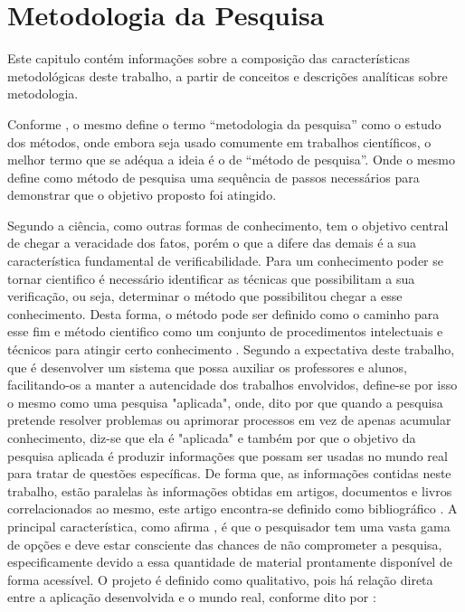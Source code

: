 \chapter{Metodologia da Pesquisa}\label{ch:metodologia-da-pesquisa}

Este capitulo contém informações sobre a composição das
características metodológicas deste trabalho, a partir de conceitos e
descrições analíticas sobre metodologia.

Conforme \textcite{wazlawick2009}, o mesmo define o termo
“metodologia da pesquisa” como o estudo dos métodos, onde embora
seja usado comumente em trabalhos científicos, o melhor termo que
se adéqua a ideia é o de “método de pesquisa”.
Onde o mesmo define como método de pesquisa uma sequência de passos
necessários para demonstrar que o objetivo proposto foi atingido.

Segundo \textcite{gil2017} a ciência, como outras formas de
conhecimento, tem o objetivo central de chegar a veracidade dos
fatos, porém o que a difere das demais é a sua característica
fundamental de verificabilidade.
Para um conhecimento poder se tornar cientifico é necessário
identificar as técnicas que possibilitam a sua verificação, ou seja,
determinar o método que possibilitou chegar a esse conhecimento.
Desta forma, o método pode ser definido como o caminho para esse fim
e método cientifico como um conjunto de procedimentos intelectuais
e técnicos para atingir certo conhecimento \cite{gil2017}.
Segundo a expectativa deste trabalho, que é desenvolver um sistema
que possa auxiliar os professores e alunos, facilitando-os a manter
a autencidade dos trabalhos envolvidos, define-se por isso o mesmo
como uma pesquisa "aplicada", onde, dito por \textcite{gil2017} que
quando a pesquisa pretende resolver problemas ou aprimorar processos
em vez de apenas acumular conhecimento, diz-se que ela é "aplicada"
e também por \textcite{prodanov2013} que o objetivo da pesquisa
aplicada é produzir informações que possam ser usadas no mundo real
para tratar de questões específicas.
De forma que, as informações contidas neste trabalho, estão paralelas
às informações obtidas em artigos, documentos e livros correlacionados
ao mesmo, este artigo encontra-se definido como bibliográfico \cite{prodanov2013}.
A principal característica, como afirma \textcite{gil2017}, é que o
pesquisador tem uma vasta gama de opções e deve estar consciente das
chances de não comprometer a pesquisa, especificamente devido a essa
quantidade de material prontamente disponível de forma acessível.
O projeto é definido como qualitativo, pois há relação direta entre
a aplicação desenvolvida e o mundo real,
conforme dito por \textcite{prodanov2013}:

